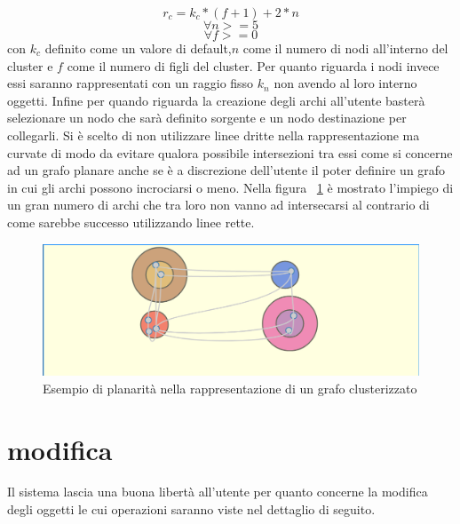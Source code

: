 {$$r_c=k_c*( f+1 )+2*n$$ 
$$\forall n>=5$$
$$ \forall f>=0$$
con $k_c$ definito come un valore di default,$n$ come il numero di nodi all'interno del cluster e $f$ come il numero di figli del cluster. Per quanto riguarda i nodi invece essi saranno rappresentati con un raggio fisso $k_n$ non avendo al loro interno oggetti.
Infine per quando riguarda la creazione degli archi all'utente basterà selezionare un nodo che sarà definito sorgente e un nodo destinazione per collegarli. Si è scelto di non utilizzare linee dritte nella rappresentazione ma curvate di modo da evitare qualora possibile intersezioni tra essi come si concerne ad un grafo planare anche se è a discrezione dell'utente il poter definire un grafo in cui gli archi possono incrociarsi o meno. Nella figura \figurename~\ref{fig:archi} è mostrato l'impiego di un gran numero di archi che tra loro non vanno ad intersecarsi al contrario di come sarebbe successo utilizzando linee rette.
\begin{figure}[!htb]
	\begin{center}
		\includegraphics[width=0.8 \linewidth]{figure/archi}
	\end{center}
	\caption{Esempio di planarità nella rappresentazione di un grafo clusterizzato\label{fig:archi}}
\end{figure}

\section{modifica}
Il sistema lascia una buona libertà all'utente per quanto concerne la modifica degli oggetti le cui operazioni saranno viste nel dettaglio di seguito. \\
}
